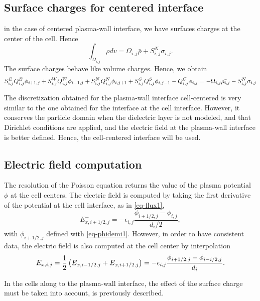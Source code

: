   \subsection{Surface charges for centered interface}
    in the case of centered plasma-wall interface, we have surfaces charges at the center of the cell.
    Hence
    \begin{equation}
    \int_{\Omega_{i,j}} \rho dv = \Omega_{i,j}\bar{\rho} + S_{i,j}^N \sigma_{i,j}.
    \end{equation}
    The surface charges behave like volume charges.
    Hence, we obtain
    \begin{equation}
    S^E_{i,j} Q^E_{i,j} \phi_{i+1,j} + S^W_{i,j} Q^W_{i,j} \phi_{i-1,j} + S^N_{i,j} Q^N_{i,j} \phi_{i,j+1} + S^S_{i,j} Q^S_{i,j} \phi_{i,j-1} - Q^C_{i,j} \phi_{i,j} = - \Omega_{i,j} \bar{\rho_{i,j}} - S^N_{i,j} \sigma_{i,j}
    \end{equation}

    The discretization obtained for the plasma-wall interface cell-centered is very similar to the one obtained for the interface at the cell interface.
    However, it conserves the particle domain when the dielectric layer is not modeled, and that Dirichlet conditions are applied, and the electric field at the plasma-wall interface is better defined.
    Hence, the cell-centered interface will be used.

    
  \subsection{Electric field computation}
  
    The resolution of the Poisson equation returns the value of the plasma potential $\phi$ at the cell centers.
    The electric field is computed by taking the first derivative of the potential at the cell interface, as in \cref{eq-flux1},
    \begin{equation} \label{eq-E_ihalf}
      E_{x, i+1/2,j}^- = - \epsilon_{i,j} \frac{\phi_{i+1/2,j} - \phi_{i,j}}{d_i/2},
    \end{equation}
    with $\phi_{i+1/2,j}$ defined with \cref{eq-phidemi1}.
    However, in order to have consistent data, the electric field is also computed at the cell center by interpolation
    \begin{equation} \label{eq-E_mean}
      E_{x, i, j} = \frac{1}{2} \left( E_{x, i-1/2,j} + E_{x, i+1/2,j} \right) =  - \epsilon_{i,j} \frac{\phi_{i+1/2,j} - \phi_{i-i/2,j}}{d_i}.
    \end{equation}
    
    In the cells along to the plasma-wall interface, the effect of the surface charge must be taken into account, is previously described.
    
  
  
  